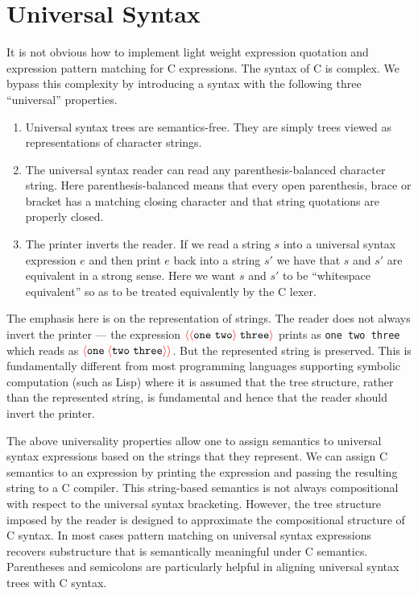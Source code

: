 \documentclass{article}
\newcommand{\fopen}{{\color{red} \langle}}
\newcommand{\fclose}{{\color{red} \rangle}}
\begin{document}
\section{Universal Syntax}

It is not obvious how to implement light weight expression quotation and expression pattern matching for C expressions.  The syntax of C is complex.
We bypass this complexity by introducing a syntax with the following three ``universal'' properties.

\begin{enumerate}
\item Universal syntax trees are semantics-free.  They are simply trees viewed as representations of character strings.

\item The universal syntax reader can read any parenthesis-balanced character string.
  Here parenthesis-balanced means that every open parenthesis, brace or bracket has a matching closing character and that string quotations
  are properly closed.
  
\item The printer inverts the reader. If we read a string $s$ into a universal syntax expression
  $e$ and then print $e$ back into a string $s'$ we have that $s$ and $s'$ are equivalent in a strong sense.  Here we want
  $s$ and $s'$ to be ``whitespace equivalent'' so as to be treated equivalently by the C lexer.
\end{enumerate}

The emphasis here is on the representation of strings.  The reader does not always invert the printer ---
the expression $\fopen \fopen \mathtt{one~two} \fclose \;\mathtt{three}\fclose$ prints as {\tt one two three} which reads as
$\fopen \mathtt{one}\; \fopen \mathtt{two~three} \fclose \fclose$.  But the represented string is preserved.  This is fundamentally different from
most programming languages supporting symbolic computation (such as Lisp) where it is assumed that the tree structure, rather than the represented string, is fundamental
and hence that the reader should invert the printer.

The above universality properties allow one to assign semantics to universal syntax expressions based on the strings that they represent.  We can assign C
semantics to an expression by printing the expression and passing the resulting string to a C compiler.  This string-based semantics is not always
compositional with respect to the universal syntax bracketing.  However, the tree structure imposed by the reader is designed to approximate the
compositional structure of C syntax.  In most cases pattern matching on universal syntax expressions recovers substructure that is semantically meaningful under C
semantics. Parentheses and semicolons are particularly helpful in aligning universal syntax trees with C syntax.
\end{document}
